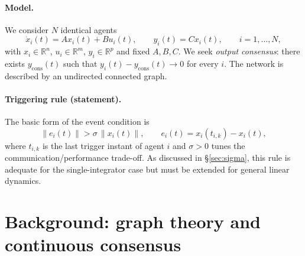 \documentclass[11pt,a4paper]{article}
\theoremstyle{remark}
\newcommand{\R}{\mathbb{R}}
\newcommand{\norm}[1]{\left\lVert#1\right\rVert}
\begin{document}
\paragraph{Model.} We consider $N$ identical agents
\begin{equation}
\dot x_i(t) = A x_i(t) + B u_i(t), \qquad y_i(t) = C x_i(t), \qquad i = 1,\dots,N,
\label{eq:agent}
\end{equation}
with $x_i\in\R^n$, $u_i\in\R^m$, $y_i\in\R^p$ and fixed $A,B,C$. We seek \emph{output consensus}:
there exists $y_{\mathrm{cons}}(t)$ such that $y_i(t)-y_{\mathrm{cons}}(t)\to 0$ for every $i$. The
network is described by an undirected connected graph.

\paragraph{Triggering rule (statement).} The basic form of the event condition is
\begin{equation}
\norm{e_i(t)} > \sigma\,\norm{x_i(t)}, \qquad e_i(t) = x_i(t_{i,k}) - x_i(t),
\label{eq:sigma}
\end{equation}
where $t_{i,k}$ is the last trigger instant of agent $i$ and $\sigma>0$ tunes the
communication/performance trade-off. As discussed in \S\ref{sec:sigma}, this rule is adequate for
the single-integrator case but must be extended for general linear dynamics.

\section{Background: graph theory and continuous consensus}
\end{document}
